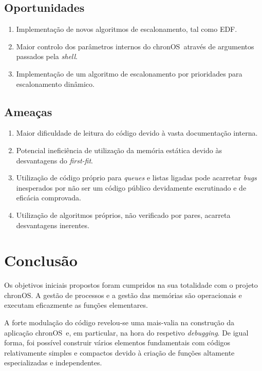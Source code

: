 \documentclass[10pt,oneside]{estiloUBI}
\newcommand{\chronOS}{\textsf{chronOS}}
\begin{document}
	
	\subsection{Oportunidades}
	
	\begin{enumerate}
		\item Implementação de novos algoritmos de escalonamento, tal como \ac{EDF}.
		\item Maior controlo dos parâmetros internos do \chronOS~através de argumentos passados pela \textit{shell}.
		\item Implementação de um algoritmo de escalonamento por prioridades para escalonamento dinâmico.
	\end{enumerate}
	
	
	\subsection{Ameaças}
	
	\begin{enumerate}
		\item Maior dificuldade de leitura do código devido à vasta documentação interna.
		\item Potencial ineficiência de utilização da memória estática devido às desvantagens do \textit{first-fit}.
		\item Utilização de código próprio para \textit{queues} e listas ligadas pode acarretar \textit{bugs} inesperados por não ser um código público devidamente escrutinado e de eficácia comprovada.
		\item Utilização de algoritmos próprios, não verificado por pares, acarreta desvantagens inerentes.
	\end{enumerate}
	
	
	\section{Conclusão}
	
	Os objetivos iniciais propostos foram cumpridos na sua totalidade com o projeto \chronOS. A gestão de processos e a gestão das memórias são operacionais e executam eficazmente as funções elementares.
	
	A forte modulação do código revelou-se uma mais-valia na construção da aplicação \chronOS~e, em particular, na hora do respetivo \textit{debugging}. De igual forma, foi possível construir vários elementos fundamentais com códigos relativamente simples e compactos devido à criação de funções altamente especializadas e independentes.
	
\end{document}
